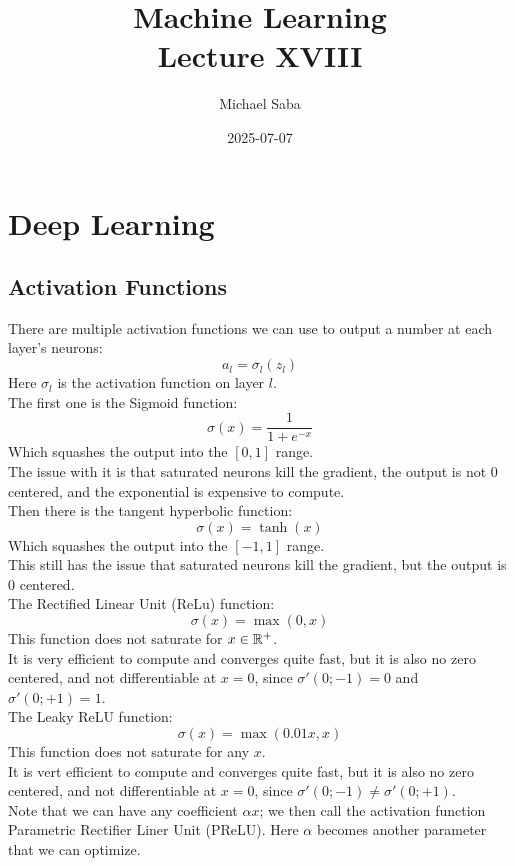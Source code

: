 \documentclass[12pt]{article}
\title{%
    \Huge Machine Learning \\
    \Large Lecture XVIII
}
\date{2025-07-07}
\author{Michael Saba}
\begin{document}
\maketitle
\newpage
\setlength{\parindent}{0pt}

\section*{Deep Learning}
\subsection*{Activation Functions}

There are multiple activation functions we can
use to output a number at each layer's neurons:
\[ a_{l} = \sigma_l(z_{l}) \]
Here $\sigma_l$ is the activation function 
on layer $l$. \\

The first one is the Sigmoid function:
\[ \sigma(x) = \dfrac{1}{1 + e^{-x}} \]
Which squashes the output into the $[0, 1]$
range. \\
The issue with it is that saturated neurons kill
the gradient, the output is not $0$ centered,
and the exponential is expensive to compute. \\

Then there is the tangent hyperbolic function:
\[ \sigma(x) = \tanh(x) \]
Which squashes the output into the $[-1, 1]$
range. \\
This still has the issue that saturated neurons kill
the gradient, but the output is $0$ centered. \\

The Rectified Linear Unit (ReLu) function:
\[ \sigma(x) = \max(0, x) \]
This function does not saturate for $x \in \mathbb{R}^+$. \\
It is very efficient to compute and converges quite
fast, but it is also no zero centered, 
and not differentiable at $x = 0$,
since $\sigma'(0; -1) = 0$ and $\sigma'(0; +1) = 1$. \\

The Leaky ReLU function:
\[ \sigma(x) = \max(0.01x, x) \]
This function does not saturate for any $x$. \\
It is vert efficient to compute and converges quite
fast, but it is also no zero centered, 
and not differentiable at $x = 0$,
since $\sigma'(0; -1) \neq \sigma'(0; +1)$. \\
Note that we can have any coefficient $\alpha x$;
we then call the activation function
Parametric Rectifier Liner Unit (PReLU).
Here $\alpha$ becomes another parameter that we can
optimize. \\
\end{document}
